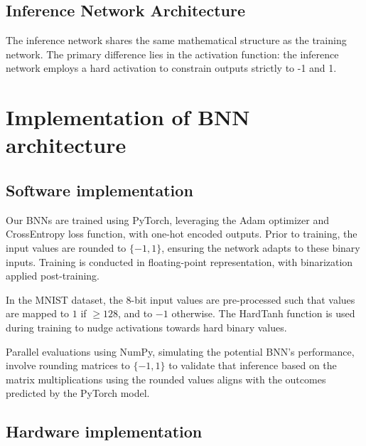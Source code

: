 \documentclass[conference]{IEEEtran}
\newcounter{todocount}
\newcommand{\todo}[1]{
  \stepcounter{todocount}
}
\begin{document}
\subsection{Inference Network Architecture}
The inference network shares the same mathematical structure as the training network. The primary difference lies in the activation function: the inference network employs a hard activation to constrain outputs strictly to -1 and 1.



\section{Implementation of BNN architecture}
\subsection{Software implementation}
Our BNNs are trained using PyTorch, leveraging the Adam optimizer and CrossEntropy loss function, with one-hot encoded outputs. Prior to training, the input values are rounded to \(\{-1, 1\}\), ensuring the network adapts to these binary inputs. Training is conducted in floating-point representation, with binarization applied post-training.

In the MNIST dataset, the 8-bit input values are pre-processed such that values are mapped to $1$ if $\geq 128$, and to $-1$ otherwise. The HardTanh function is used during training to nudge activations towards hard binary values. 

Parallel evaluations using NumPy, simulating the potential BNN's performance, involve rounding matrices to \(\{-1, 1\}\) to validate that inference based on the matrix multiplications using the rounded values aligns with the outcomes predicted by the PyTorch model.


\subsection{Hardware implementation}


\end{document}
